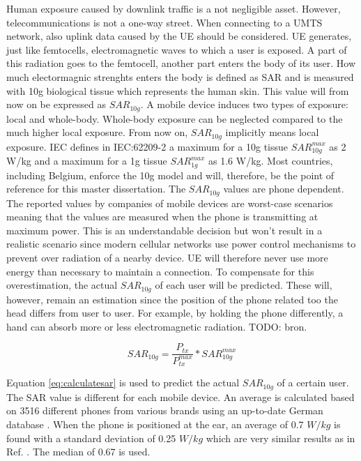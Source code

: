 Human exposure caused by downlink traffic is a not negligible asset. However, telecommunications is not a one-way street. When connecting to a UMTS network, also uplink data caused by the \gls{UE} should be considered.
\gls{UE} generates, just like femtocells, electromagnetic waves to which a user is exposed. A part of this radiation goes to the femtocell, another part enters the body of its user. How much electormagnic strenghts enters the body is defined as \gls{SAR} and is measured with 10g biological tissue which represents the human skin. This value will from now on be expressed as $SAR_{10g}$. 
A mobile device induces two types of exposure: local and whole-body. Whole-body exposure can be neglected compared to the much higher local exposure\cite{j10.1.1_gati2010duality}.  From now on, $SAR_{10g}$ implicitly means local exposure.
\gls{IEC} defines in IEC:62209-2 a maximum for a 10g tissue $SAR^{max}_{10g}$ as 2 W/kg and a maximum for a 1g tissue $SAR^{max}_{1g}$ as 1.6 W/kg. Most countries, including Belgium, enforce the 10g model and will, therefore, be the point of reference for this master dissertation.
The $SAR_{10g}$ values are phone dependent. The reported values by companies of mobile devices are worst-case scenarios meaning that the values are measured when the phone is transmitting at maximum power. This is an understandable decision but won't result in a realistic scenario since modern cellular networks use power control mechanisms to prevent over radiation of a nearby device. \gls{UE} will therefore never use more energy than necessary to maintain a connection.
To compensate for this overestimation, the actual $SAR_{10g}$ of each user will be predicted. These will, however, remain an estimation since the position of the phone related too the head differs from user to user. For example, by holding the phone differently, a hand can absorb more or less electromagnetic radiation. TODO: bron.

\begin{equation}
{SAR}_{10g} = \frac{P_{tx}}{P^{max}_{tx}} * {SAR}^{max}_{10g}
\label{eq:calculatesar}
\end{equation}

Equation \ref{eq:calculatesar} is used to predict the actual $SAR_{10g}$  of a certain user. The \gls{SAR} value is different for each mobile device. An average is calculated based on 3516 different phones from various brands using an up-to-date German database \cite{SARDatabase}.
When the phone is positioned at the ear, an average of 0.7 $W/kg$ is found with a standard deviation of 0.25 $W/kg$ which are very similar results as in Ref. \cite{j10.1.1_gati2010duality}. The median of 0.67 is used.


